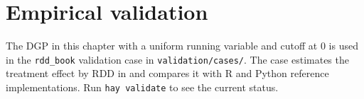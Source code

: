 \section{Empirical validation}

The DGP in this chapter with a uniform running variable and cutoff at 0 is
used in the \texttt{rdd\_book} validation case in \texttt{validation/cases/}.
The case estimates the treatment effect by RDD in \hayashi{} and compares it
with R and Python reference implementations. Run \lstinline{hay validate} to
see the current status.

